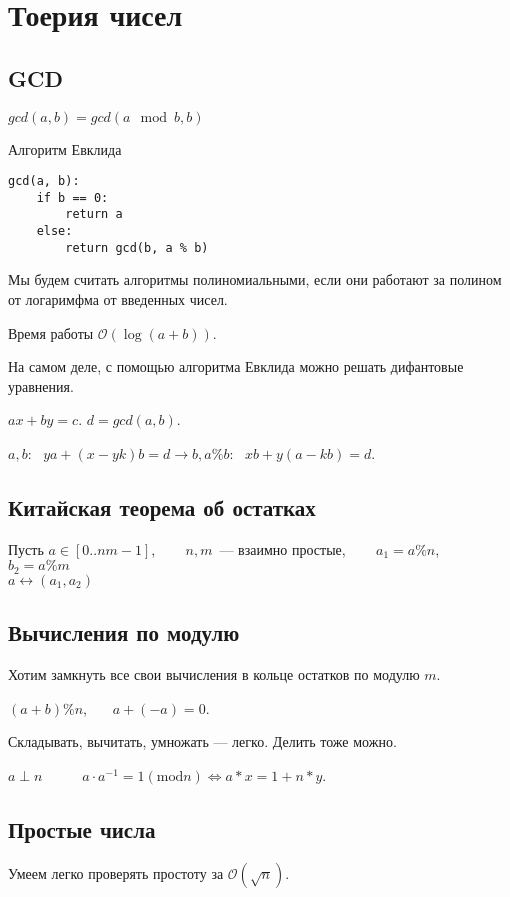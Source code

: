 \section{Тоерия чисел}

\subsection{GCD}
$gcd(a, b) = gcd(a \mod b, b)$


Алгоритм Евклида
\begin{lstlisting}[mathescape=true]
gcd(a, b):
    if b == 0:
        return a
    else:
        return gcd(b, a % b)
\end{lstlisting}

Мы будем считать алгоритмы полиномиальными, если они работают за полином от логаримфма от введенных чисел.

Время работы $\mathcal{O} (\log (a + b))$.

На самом деле, с помощью алгоритма Евклида можно решать дифантовые уравнения.

$ax + by = c$.
$d = gcd(a ,b )$.

$a, b:~~~ y a + (x - y k) b = d \longrightarrow b, a \% b:~~~ x b + y(a - kb) = d$.

\subsection{Китайская теорема об остатках}

Пусть $a \in [0..nm - 1]$, ~~~ $n, m$~--- взаимно простые, ~~~
$a_1 = a \% n$, ~~ $ b_2 = a\% m$\\
$a \leftrightarrow (a_1, a_2)$

\subsection{Вычисления по модулю}

Хотим замкнуть все свои вычисления в кольце остатков по модулю $m$.

$(a + b) \% n$,~~~ $a + (-a) = 0$.

Складывать, вычитать, умножать --- легко. Делить тоже можно.

$a \perp n$~~~~~ $a \cdot a^{-1} = 1 (\mathrm{mod} n) \iff a * x = 1 + n * y$.

\subsection{Простые числа}

Умеем легко проверять простоту за $\mathcal{ O} (\sqrt {n})$.
